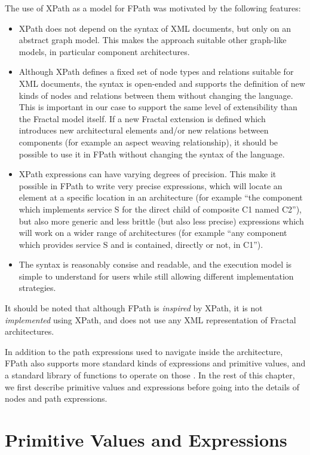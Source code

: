 \documentclass[a4paper,12pt]{report}
\begin{document}
The use of XPath as a model for FPath was motivated by the following features:
\begin{itemize}
\item XPath does not depend on the syntax of XML documents, but only on an abstract graph
  model. This makes the approach suitable other graph-like models, in particular component
  architectures.
\item Although XPath defines a fixed set of node types and relations suitable for XML
  documents, the syntax is open-ended and supports the definition of new kinds of nodes
  and relations between them without changing the language. This is important in our case
  to support the same level of extensibility than the Fractal model itself. If a new
  Fractal extension is defined which introduces new architectural elements and/or new
  relations between components (for example an aspect weaving relationship), it should be
  possible to use it in FPath without changing the syntax of the language.
\item XPath expressions can have varying degrees of precision. This make it possible in
  FPath to write very precise expressions, which will locate an element at a specific
  location in an architecture (for example ``the component which implements service S for
  the direct child of composite C1 named C2''), but also more generic and less brittle
  (but also less precise) expressions which will work on a wider range of architectures
  (for example ``any component which provides service S and is contained, directly or not,
  in C1'').
\item The syntax is reasonably consise and readable, and the execution model is simple to
  understand for users while still allowing different implementation strategies.
\end{itemize}

It should be noted that although FPath is \emph{inspired} by XPath, it is not
\emph{implemented} using XPath, and does not use any XML representation of Fractal
architectures.

In addition to the path expressions used to navigate inside the architecture, FPath also
supports more standard kinds of expressions and primitive values, and a standard library
of functions to operate on those %
. In the rest of
this chapter, we first describe primitive values and expressions before going into the
details of nodes and path expressions.

\section{Primitive Values and Expressions}
\label{sec:std-expressions}
\end{document}
